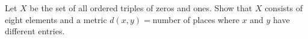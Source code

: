 Let $X$ be the set of all ordered triples of zeros and ones. Show that $X$ consists of eight elements
and a metric $d(x,y)=$number of places where $x$ and $y$ have different entries.\\